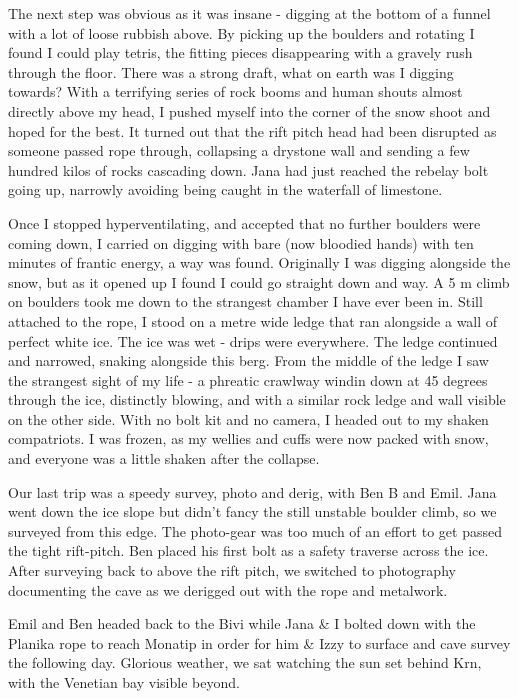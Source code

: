 The next step was obvious as it was insane - digging at the bottom of a
funnel with a lot of loose rubbish above. By picking up the boulders and
rotating I found I could play tetris, the fitting pieces disappearing
with a gravely rush through the floor. There was a strong draft, what on
earth was I digging towards? With a terrifying series of rock booms and
human shouts almost directly above my head, I pushed myself into the
corner of the snow shoot and hoped for the best. It turned out that the
rift pitch head had been disrupted as someone passed rope through,
collapsing a drystone wall and sending a few hundred kilos of rocks
cascading down. Jana had just reached the rebelay bolt going up,
narrowly avoiding being caught in the waterfall of limestone.

Once I stopped hyperventilating, and accepted that no further boulders
were coming down, I carried on digging with bare (now bloodied hands)
with ten minutes of frantic energy, a way was found. Originally I was
digging alongside the snow, but as it opened up I found I could go
straight down and way. A 5 m climb on boulders took me down to the
strangest chamber I have ever been in. Still attached to the rope, I
stood on a metre wide ledge that ran alongside a wall of perfect white
ice. The ice was wet - drips were everywhere. The ledge continued and
narrowed, snaking alongside this berg. From the middle of the ledge I
saw the strangest sight of my life - a phreatic crawlway windin down at
45 degrees through the ice, distinctly blowing, and with a similar rock
ledge and wall visible on the other side. With no bolt kit and no
camera, I headed out to my shaken compatriots. I was frozen, as my
wellies and cuffs were now packed with snow, and everyone was a little
shaken after the collapse.

Our last trip was a speedy survey, photo and derig, with Ben B and Emil.
Jana went down the ice slope but didn't fancy the still unstable boulder
climb, so we surveyed from this edge. The photo-gear was too much of an
effort to get passed the tight rift-pitch. Ben placed his first bolt as
a safety traverse across the ice. After surveying back to above the rift
pitch, we switched to photography documenting the cave as we derigged
out with the rope and metalwork.

Emil and Ben headed back to the Bivi while Jana \& I bolted down with
the Planika rope to reach Monatip in order for him \& Izzy to surface
and cave survey the following day. Glorious weather, we sat watching the
sun set behind Krn, with the Venetian bay visible beyond.


